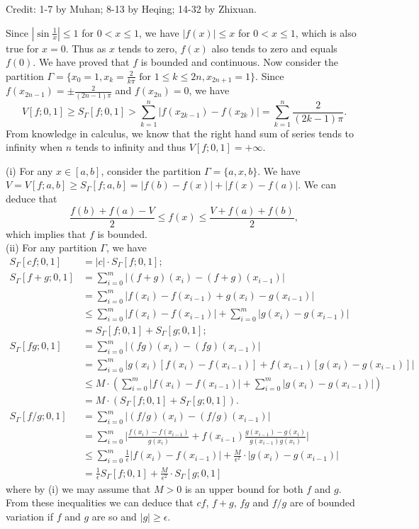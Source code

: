 
Credit: 1-7 by Muhan; 8-13 by Heqing; 14-32 by Zhixuan.

\begin{exercise}{2.1}
  Since $|\sin{\frac{1}{x}}|\leq1$ for $0<x\leq 1$,
  we have $|f(x)|\leq x$ for $0<x\leq 1$,
  which is also true for $x=0$.
  Thus as $x$ tends to zero,
  $f(x)$ also tends to zero and equals $f(0)$.
  We have proved that $f$ is bounded and continuous.
  Now consider the partition
  $\Gamma=\{x_0=1,x_k=\frac{2}{k\pi}\text{ for }1\leq k\leq 2n, x_{2n+1}=1\}$.
  Since $f(x_{2n-1})=\pm\frac{2}{(2n-1)\pi}$ and $f(x_{2n})=0$,
  we have
  \[
    V[f;0,1]\geq S_{\Gamma}[f;0,1]>\sum_{k=1}^{n}|f(x_{2k-1})-f(x_{2k})|=\sum_{k=1}^{n}\frac{2}{(2k-1)\pi}.
  \]
  From knowledge in calculus,
  we know that the right hand sum of series tends to infinity
  when $n$ tends to infinity and thus $V[f;0,1]=+\infty$.
\end{exercise}

\begin{exercise}{2.2}
(i) For any $x\in [a,b]$, consider the partition $\Gamma=\{a,x,b\}$.
We have $V=V[f;a,b]\geq S_{\Gamma}[f;a,b]=|f(b)-f(x)|+|f(x)-f(a)|$.
We can deduce that
\[
  \frac{f(b)+f(a)-V}{2}\leq f(x)\leq \frac{V+f(a)+f(b)}{2},
\]
which implies that $f$ is bounded.\\
(ii) For any partition $\Gamma$, we have
\allowdisplaybreaks
\begin{align*}
  S_{\Gamma}[cf;0,1]&=|c|\cdot S_{\Gamma}[f;0,1];\\
  S_{\Gamma}[f+g;0,1]&=\sum_{i=0}^m|(f+g)(x_i)-(f+g)(x_{i-1})|\\
  &=\sum_{i=0}^m|f(x_i)-f(x_{i-1})+g(x_i)-g(x_{i-1})|\\
  &\leq\sum_{i=0}^m|f(x_i)-f(x_{i-1})|+\sum_{i=0}^m|g(x_i)-g(x_{i-1})|\\
  &=S_{\Gamma}[f;0,1]+S_{\Gamma}[g;0,1];\\
  S_{\Gamma}[fg;0,1]&=\sum_{i=0}^m|(fg)(x_i)-(fg)(x_{i-1})|\\
  &=\sum_{i=0}^m|g(x_i)[f(x_i)-f(x_{i-1})]+f(x_{i-1})[g(x_i)-g(x_{i-1})]|\\
  &\leq M\cdot(\sum_{i=0}^m|f(x_i)-f(x_{i-1})|+\sum_{i=0}^m|g(x_i)-g(x_{i-1})|)\\
  &=M\cdot (S_{\Gamma}[f;0,1]+S_{\Gamma}[g;0,1]).\\
  S_{\Gamma}[f/g;0,1]&=\sum_{i=0}^m|(f/g)(x_i)-(f/g)(x_{i-1})|\\
  &=\sum_{i=0}^m\bigg|\frac{f(x_i)-f(x_{i-1})}{g(x_i)}+f(x_{i-1})\frac{g(x_{i-1})-g(x_i)}{g(x_{i-1})g(x_i)}\bigg|\\
  &\leq \sum_{i=0}^m\frac{1}{\epsilon}|f(x_i)-f(x_{i-1})|+\frac{M}{\epsilon^2}\cdot|g(x_i)-g(x_{i-1})|\\
  &=\frac{1}{\epsilon}S_{\Gamma}[f;0,1]+\frac{M}{\epsilon^2}\cdot S_{\Gamma}[g;0,1]
\end{align*}
where by (i) we may assume that $M>0$ is an upper bound for both $f$ and $g$.
From these inequalities we can deduce that $cf$, $f+g$, $fg$ and $f/g$
are of bounded variation if $f$ and $g$ are so and $|g|\geq \epsilon$.
\end{exercise}

